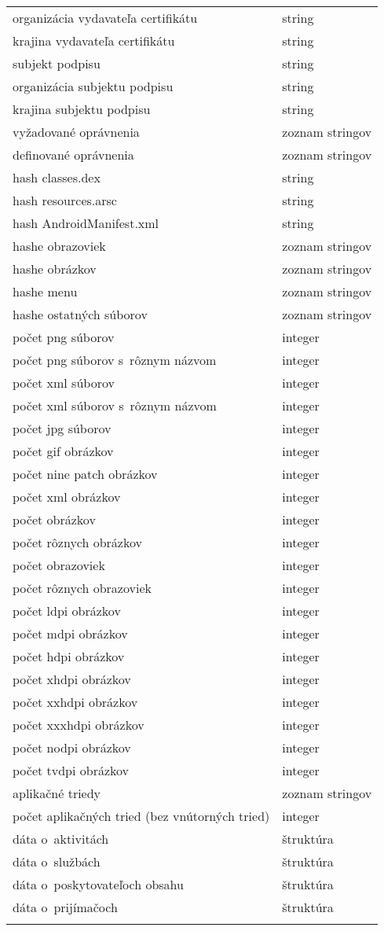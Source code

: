 \begin{longtable}{|l|p{3.3cm}|}
organizácia vydavateľa certifikátu						& string\\
krajina vydavateľa certifikátu						& string\\
subjekt podpisu						& string\\
organizácia subjektu podpisu						& string\\
krajina subjektu podpisu						& string\\
vyžadované oprávnenia					& zoznam stringov \\
definované oprávnenia					& zoznam stringov \\
hash classes.dex						& string \\
hash resources.arsc						& string \\
hash AndroidManifest.xml				& string \\
hashe obrazoviek						& zoznam stringov \\
hashe obrázkov						& zoznam stringov \\
hashe menu						& zoznam stringov \\
hashe ostatných súborov						& zoznam stringov \\
počet png súborov							& integer \\
počet png súborov s~rôznym názvom							& integer \\
počet xml súborov							& integer \\
počet xml súborov s~rôznym názvom							& integer \\
počet jpg súborov 					& integer \\
počet gif obrázkov 					& integer \\
počet nine patch obrázkov 					& integer \\
počet xml obrázkov 					& integer \\
počet obrázkov 					& integer \\
počet rôznych obrázkov 					& integer \\
počet obrazoviek 					& integer \\
počet rôznych obrazoviek 					& integer \\
počet ldpi obrázkov					& integer \\
počet mdpi obrázkov 					& integer \\
počet hdpi obrázkov 					& integer \\
počet xhdpi obrázkov 					& integer \\
počet xxhdpi obrázkov 					& integer \\
počet xxxhdpi obrázkov 					& integer \\
počet nodpi obrázkov 					& integer \\
počet tvdpi obrázkov 					& integer \\
aplikačné triedy					& zoznam stringov \\
počet aplikačných tried	(bez vnútorných tried)				& integer \\
dáta o~aktivitách				& štruktúra \\
dáta o~službách				& štruktúra \\
dáta o~poskytovateľoch obsahu				& štruktúra \\
dáta o~prijímačoch				& štruktúra \\

  \label{tab:ziskaneData}
\end{longtable}